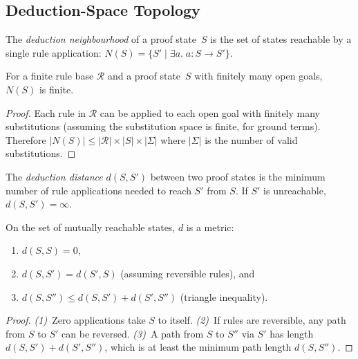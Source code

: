 \documentclass[11pt]{article}
\begin{document}
\subsection{Deduction-Space Topology}

\begin{definition}%
\label{def:dedneighbour}
The \emph{deduction neighbourhood} of a proof state~$S$ is
the set of states reachable by a single rule application:
$N(S) = \{S' \mid \exists a.\; a \colon S \to S'\}$.
\end{definition}

\begin{lemma}%
\label{lem:neighfinite}
For a finite rule base $\mathcal{R}$ and a proof state~$S$
with finitely many open goals, $N(S)$ is finite.
\end{lemma}
\begin{proof}
Each rule in $\mathcal{R}$ can be applied to each open goal
with finitely many substitutions (assuming the substitution
space is finite, \eg{} for ground terms).  Therefore $|N(S)|
\leq |\mathcal{R}| \times |S| \times |\Sigma|$ where
$|\Sigma|$ is the number of valid substitutions.
\end{proof}

\begin{definition}%
\label{def:deddist}
The \emph{deduction distance} $d(S, S')$ between two proof
states is the minimum number of rule applications needed to
reach $S'$ from $S$.  If $S'$ is unreachable, $d(S, S') = \infty$.
\end{definition}

\begin{lemma}%
\label{lem:distmetric}
On the set of mutually reachable states, $d$ is a metric:
\begin{enumerate}
\item $d(S, S) = 0$,
\item $d(S, S') = d(S', S)$ (assuming reversible rules), and
\item $d(S, S'') \leq d(S, S') + d(S', S'')$ (triangle inequality).
\end{enumerate}
\end{lemma}
\begin{proof}
\emph{(1)}~Zero applications take $S$ to itself.
\emph{(2)}~If rules are reversible, any path from $S$ to $S'$
can be reversed.
\emph{(3)}~A path from $S$ to $S''$ via $S'$ has length
$d(S, S') + d(S', S'')$, which is at least the minimum
path length $d(S, S'')$.
\end{proof}
\end{document}
